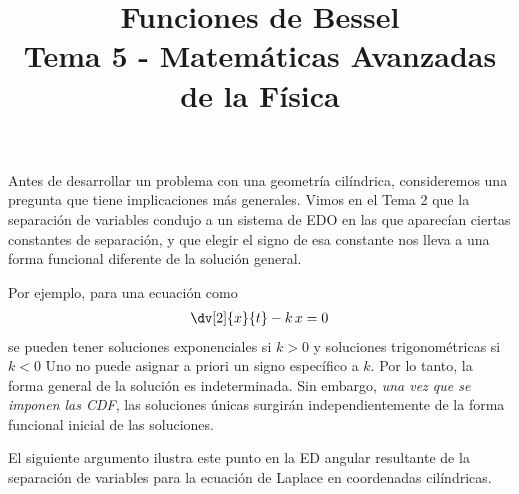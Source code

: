 
\title{Funciones de Bessel \\ {\large Tema 5 - Matemáticas Avanzadas de la Física}\vspace{-1.5\baselineskip}}
\date{ }
\author{}

\maketitle
\fontsize{14}{14}\selectfont
Antes de desarrollar un problema con una geometría cilíndrica, consideremos una pregunta que tiene implicaciones más generales. Vimos en el Tema 2 que la separación de variables condujo a un sistema de EDO en las que aparecían ciertas constantes de separación, y que elegir el signo de esa constante nos lleva a una forma funcional diferente de la solución general.
\par
Por ejemplo, para una ecuación como
\begin{align*}
\dv[2]{x}{t} - k \, x = 0
\end{align*}
se pueden tener soluciones exponenciales si $k > 0$ y soluciones trigonométricas si $k < 0$ Uno no puede asignar a priori un signo específico a $k$. Por lo tanto, la forma general de la solución es indeterminada. Sin embargo, \emph{una vez que se imponen las CDF}, las soluciones únicas surgirán independientemente de la forma funcional inicial de las soluciones.
\par
El siguiente argumento ilustra este punto en la ED angular resultante de la separación de variables para la ecuación de Laplace en coordenadas cilíndricas.
